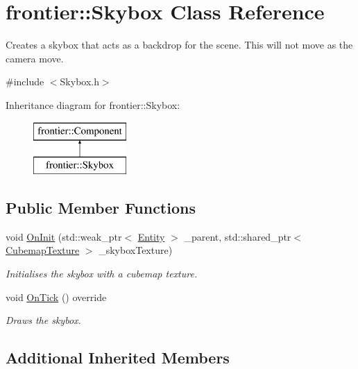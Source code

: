 \hypertarget{classfrontier_1_1_skybox}{}\section{frontier\+:\+:Skybox Class Reference}
\label{classfrontier_1_1_skybox}


Creates a skybox that acts as a backdrop for the scene. This will not move as the camera move.  




{\ttfamily \#include $<$Skybox.\+h$>$}

Inheritance diagram for frontier\+:\+:Skybox\+:\begin{figure}[H]
\begin{center}
\leavevmode
\includegraphics[height=2.000000cm]{classfrontier_1_1_skybox}
\end{center}
\end{figure}
\subsection*{Public Member Functions}
\begin{DoxyCompactItemize}
\item 
void \hyperlink{classfrontier_1_1_skybox_a02a06c87053a2efd6893c0b07465f3c2}{On\+Init} (std\+::weak\+\_\+ptr$<$ \hyperlink{classfrontier_1_1_entity}{Entity} $>$ \+\_\+parent, std\+::shared\+\_\+ptr$<$ \hyperlink{classfrontier_1_1_cubemap_texture}{Cubemap\+Texture} $>$ \+\_\+skybox\+Texture)
\begin{DoxyCompactList}\small\item\em Initialises the skybox with a cubemap texture. \end{DoxyCompactList}\item 
void \hyperlink{classfrontier_1_1_skybox_a38b2ec1a28314c901f4388745d8f0471}{On\+Tick} () override
\begin{DoxyCompactList}\small\item\em Draws the skybox. \end{DoxyCompactList}\end{DoxyCompactItemize}
\subsection*{Additional Inherited Members}


